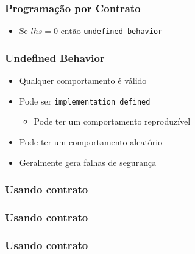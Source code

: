 \documentclass[14pt]{beamer}
\begin{document}
\frame
{
  \frametitle{Programação por Contrato}

  \usebox{\listingboxe}

  \begin{itemize}
  \item Se $lhs = 0$ então \texttt{undefined behavior}
  \end{itemize}
}

\frame
{
  \frametitle{Undefined Behavior}

  \begin{itemize}
  \item \alert<1>{Qualquer} comportamento é válido
  \item<2-> Pode ser \texttt{implementation defined}
    \begin{itemize}
    \item<3-> Pode ter um comportamento reproduzível
    \end{itemize}
  \item<4-> Pode ter um comportamento aleatório
  \item<5-> Geralmente gera falhas de segurança
  \end{itemize}
}

\newsavebox{\listingboxf}
\begin{lrbox}{\listingboxf}

\end{lrbox}

\frame
{
  \frametitle{Usando contrato}

  \usebox{\listingboxf}
}

\newsavebox{\listingboxg}
\begin{lrbox}{\listingboxg}

\end{lrbox}

\frame
{
  \frametitle{Usando contrato}

  \usebox{\listingboxg}
}

\newsavebox{\listingboxh}
\begin{lrbox}{\listingboxh}

\end{lrbox}

\frame
{
  \frametitle{Usando contrato}

  \usebox{\listingboxh}
}

\newsavebox{\listingboxi}
\begin{lrbox}{\listingboxi}

\end{lrbox}
\end{document}
